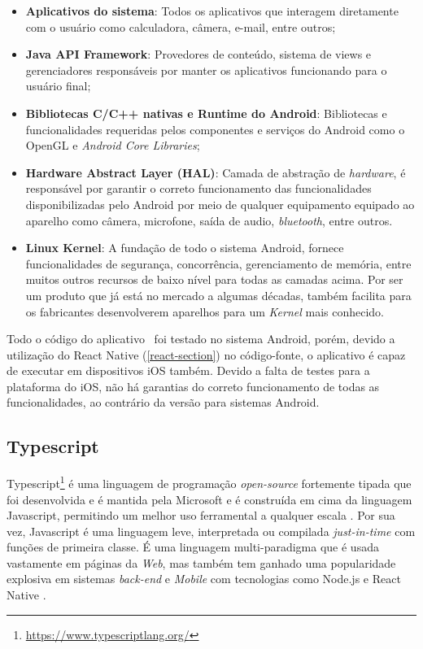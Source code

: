 \begin{itemize}
    \item \textbf{Aplicativos do sistema}: Todos os aplicativos que interagem diretamente com o usuário como calculadora, câmera, e-mail, entre outros;
    \item \textbf{Java API Framework}: Provedores de conteúdo, sistema de views e gerenciadores responsáveis por manter os aplicativos funcionando para o usuário final;
    \item \textbf{Bibliotecas C/C++ nativas e Runtime do Android}: Bibliotecas e funcionalidades requeridas pelos componentes e serviços do Android como o OpenGL e \textit{Android Core Libraries};
    \item \textbf{Hardware Abstract Layer (HAL)}: Camada de abstração de \textit{hardware}, é responsável por garantir o correto funcionamento das funcionalidades disponibilizadas pelo Android por meio de qualquer equipamento equipado ao aparelho como câmera, microfone, saída de audio, \textit{bluetooth}, entre outros.
    \item \textbf{Linux Kernel}: A fundação de todo o sistema Android, fornece funcionalidades de segurança, concorrência, gerenciamento de memória, entre muitos outros recursos de baixo nível para todas as camadas acima. Por ser um produto que já está no mercado a algumas décadas, também facilita para os fabricantes desenvolverem aparelhos para um \textit{Kernel} mais conhecido.
\end{itemize}

Todo o código do aplicativo \appName\ foi testado no sistema Android, porém, devido a utilização do React Native (\ref{react-section}) no código-fonte, o aplicativo é capaz de executar em dispositivos iOS também. Devido a falta de testes para a plataforma do iOS, não há garantias do correto funcionamento de todas as funcionalidades, ao contrário da versão para sistemas Android.

\subsection{Typescript}

Typescript\footnote{\url{https://www.typescriptlang.org/}} é uma linguagem de programação \textit{open-source} fortemente tipada que foi desenvolvida e é mantida pela Microsoft e é construída em cima da linguagem Javascript, permitindo um melhor uso ferramental a qualquer escala \cite{typescript}. Por sua vez, Javascript é uma linguagem leve, interpretada ou compilada \textit{just-in-time} com funções de primeira classe. É uma linguagem multi-paradigma que é usada vastamente em páginas da \textit{Web}, mas também tem ganhado uma popularidade explosiva em sistemas \textit{back-end} e \textit{Mobile} com tecnologias como Node.js e React Native \cite{javascript}.

